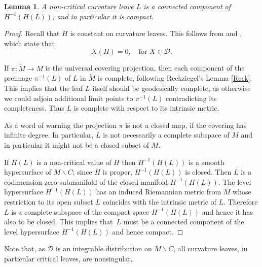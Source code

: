 \documentclass[JEP,XML,SOM,Unicode]{cedram}
\let\mathcal\mathscr
\let\moins\smallsetminus
\newtheorem{lemma}[theorem]{Lemma}
\theoremstyle{definition}
\theoremstyle{remark}
\numberwithin{equation}{section}
\begin{document}
\begin{lemma}\label{noncritical}
A non-critical curvature leave $L$ is a connected component of
$H^{-1}(H(L))$, and in particular it is compact.
\end{lemma}
\begin{proof}
Recall that $H$ is constant on curvature leaves. This follows from \cite[(3.5)]{BP} and \cite[(3.4-3.5)(i)]{GM}, which state that
\[ X(H)=0, \quad\text{for }X\in \mathcal D.\]

If $\pi:\widetilde{M}\to M$ is the universal covering projection, then
each component of the preimage $\pi^{-1}(L)$ of $L$
in $\widetilde{M}$ is complete, following Reckziegel's Lemma \ref{Reck}.
This implies that the leaf $L$ itself should be
geodesically complete, as otherwise
we could adjoin additional limit points to $\pi^{-1}(L)$ contradicting
its completeness. Thus $L$ is complete with respect to its
intrinsic metric.

As a word of warning the projection $\pi$ is not a closed map, if
the covering has infinite degree. In particular, $L$ is not necessarily
a complete subspace of $M$ and in particular
it might not be a closed subset of $M$.

If $H(L)$ is a non-critical value of $H$ then $H^{-1}(H(L))$ is a smooth hypersurface of $M\moins C$; since $H$ is proper,
$H^{-1}(H(L))$ is closed. Then $L$ is a codimension zero
submanifold of the closed manifold $H^{-1}(H(L))$. The level hypersurface
$H^{-1}(H(L))$ has an induced Riemannian metric from $M$ whose restriction
to its open subset $L$ coincides with the intrinsic metric of $L$.
Therefore $L$ is a complete subspace of the compact space
$H^{-1}(H(L))$ and hence it has also to be closed.
This implies that~$L$ must be a connected component
of the level hypersurface $H^{-1}(H(L))$ and hence compact.
\end{proof}

Note that, as $\mathcal D$ is an integrable distribution on $M\moins C$,
all curvature leaves, in particular critical leaves, are nonsingular.
\end{document}
